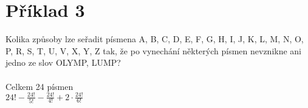 \section*{Příklad 3}
Kolika způsoby lze seřadit písmena A, B, C, D, E, F, G, H, I, J, K, L, M, N, O, P, R, S, T, U, V, X,
Y, Z tak, že po vynechání některých písmen nevznikne ani jedno ze slov OLYMP, LUMP? \\\\
Celkem 24 písmen \\

$ 24! - \frac{24!}{5!} - \frac{24!}{4!} + 2 \cdot \frac{24!}{6!}$
